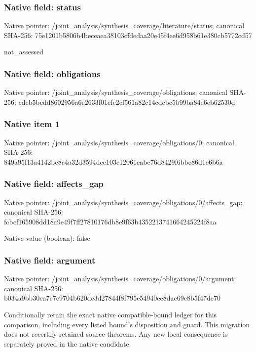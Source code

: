 \documentclass[10pt,a4paper]{article}
\begin{document}
\subsubsection{Native field: status}
Native pointer: /joint\_\allowbreak{}analysis/synthesis\_\allowbreak{}coverage/literature/status; canonical SHA-256: 75e1201b5806b4beceaea38103cfdedaa20e45f4ee6d958b61e380cb5772cd57

\begingroup\raggedright\sloppy not\_\allowbreak{}assessed\par\endgroup

\subsubsection{Native field: obligations}
Native pointer: /joint\_\allowbreak{}analysis/synthesis\_\allowbreak{}coverage/obligations; canonical SHA-256: cdcb5bcdd8602956a6e2633f01efc2cf561a82c14cdcbc5b99ba84e6eb62530d

\subsubsection{Native item 1}
Native pointer: /joint\_\allowbreak{}analysis/synthesis\_\allowbreak{}coverage/obligations/0; canonical SHA-256: 849a95f13a4142be8c4a32d3594dce103e12061eabe76d8429f6bbe86d1e6b6a

\subsubsection{Native field: affects\_\allowbreak{}gap}
Native pointer: /joint\_\allowbreak{}analysis/synthesis\_\allowbreak{}coverage/obligations/0/affects\_\allowbreak{}gap; canonical SHA-256: fcbcf165908dd18a9e49f7ff27810176db8e9f63b4352213741664245224f8aa

Native value (boolean): false

\subsubsection{Native field: argument}
Native pointer: /joint\_\allowbreak{}analysis/synthesis\_\allowbreak{}coverage/obligations/0/argument; canonical SHA-256: b034a9bb30ea7c7c9704b620dc3d27844f8f795e54940ec8dac69c8b5f47de70

\begingroup\raggedright\sloppy Conditionally retain the exact native compatible-bound ledger for this comparison,\allowbreak{} including every listed bound's disposition and guard. This migration does not recertify retained source theorems. Any new local consequence is separately proved in the native candidate.\par\endgroup
\end{document}
